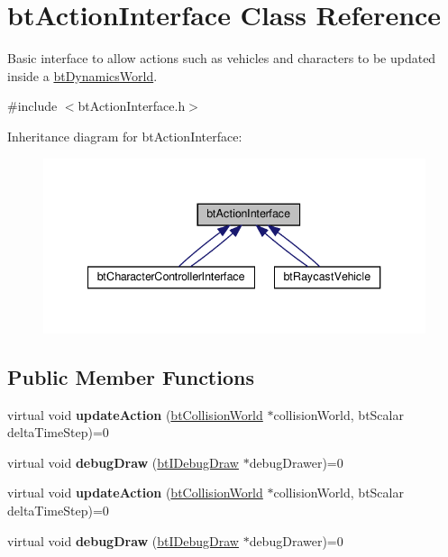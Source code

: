 \hypertarget{classbtActionInterface}{}\section{bt\+Action\+Interface Class Reference}
\label{classbtActionInterface}


Basic interface to allow actions such as vehicles and characters to be updated inside a \hyperlink{classbtDynamicsWorld}{bt\+Dynamics\+World}.  




{\ttfamily \#include $<$bt\+Action\+Interface.\+h$>$}



Inheritance diagram for bt\+Action\+Interface\+:
\nopagebreak
\begin{figure}[H]
\begin{center}
\leavevmode
\includegraphics[width=340pt]{classbtActionInterface__inherit__graph}
\end{center}
\end{figure}
\subsection*{Public Member Functions}
\begin{DoxyCompactItemize}
\item 
\mbox{\label{classbtActionInterface_af4ab1d50c7c4997edd510a0b31e55b42}} 
virtual void {\bfseries update\+Action} (\hyperlink{classbtCollisionWorld}{bt\+Collision\+World} $\ast$collision\+World, bt\+Scalar delta\+Time\+Step)=0
\item 
\mbox{\label{classbtActionInterface_a8e4276e041d520cffc836dfd311749ec}} 
virtual void {\bfseries debug\+Draw} (\hyperlink{classbtIDebugDraw}{bt\+I\+Debug\+Draw} $\ast$debug\+Drawer)=0
\item 
\mbox{\label{classbtActionInterface_af4ab1d50c7c4997edd510a0b31e55b42}} 
virtual void {\bfseries update\+Action} (\hyperlink{classbtCollisionWorld}{bt\+Collision\+World} $\ast$collision\+World, bt\+Scalar delta\+Time\+Step)=0
\item 
\mbox{\label{classbtActionInterface_a8e4276e041d520cffc836dfd311749ec}} 
virtual void {\bfseries debug\+Draw} (\hyperlink{classbtIDebugDraw}{bt\+I\+Debug\+Draw} $\ast$debug\+Drawer)=0
\end{DoxyCompactItemize}
